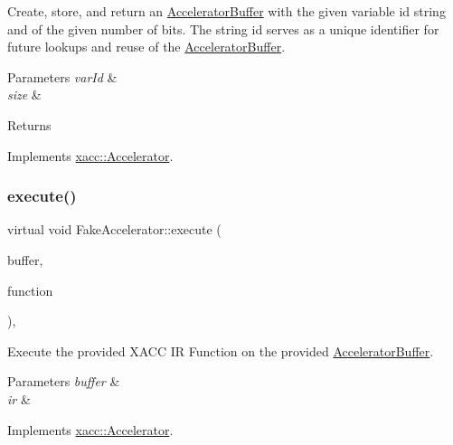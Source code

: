 Create, store, and return an \hyperlink{a02444}{Accelerator\+Buffer} with the given variable id string and of the given number of bits. The string id serves as a unique identifier for future lookups and reuse of the \hyperlink{a02444}{Accelerator\+Buffer}.


\begin{DoxyParams}{Parameters}
{\em var\+Id} & \\
\hline
{\em size} & \\
\hline
\end{DoxyParams}
\begin{DoxyReturn}{Returns}

\end{DoxyReturn}


Implements \hyperlink{a02432_a064a2dbd58338364115c260267806945}{xacc\+::\+Accelerator}.

\mbox{\label{a02496_a22c71bda017235865f1b7d4cc5e911fa}} 
\subsubsection{\texorpdfstring{execute()}{execute()}}
{\footnotesize\ttfamily virtual void Fake\+Accelerator\+::execute (\begin{DoxyParamCaption}\item[{std\+::shared\+\_\+ptr$<$ \hyperlink{a02444}{Accelerator\+Buffer} $>$}]{buffer,  }\item[{const std\+::shared\+\_\+ptr$<$ \hyperlink{a02456}{Function} $>$}]{function }\end{DoxyParamCaption})\hspace{0.3cm}{\ttfamily [inline]}, {\ttfamily [virtual]}}

Execute the provided X\+A\+CC IR Function on the provided \hyperlink{a02444}{Accelerator\+Buffer}.


\begin{DoxyParams}{Parameters}
{\em buffer} & \\
\hline
{\em ir} & \\
\hline
\end{DoxyParams}


Implements \hyperlink{a02432_a89b3f3e6294f228abf03a410b0fb1674}{xacc\+::\+Accelerator}.

\mbox{\label{a02496_a6be5485b52606b4543d7e08eda4d6b69}} 
